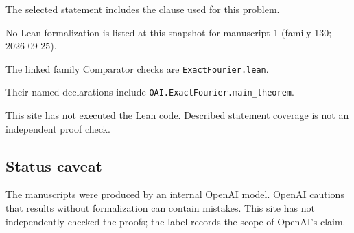 \documentclass[11pt]{article}
\begin{document}
The selected statement includes the clause used for this problem.

No Lean formalization is listed at this snapshot for manuscript 1 (family 130; 2026-09-25).

The linked family Comparator checks are \texttt{ExactFourier.lean}.

Their named declarations include \texttt{OAI.ExactFourier.main\_theorem}.

This site has not executed the Lean code. Described statement coverage is not an independent proof check.

\subsection{Status caveat}
The manuscripts were produced by an internal OpenAI model. OpenAI cautions that results without formalization can contain mistakes. This site has not independently checked the proofs; the label records the scope of OpenAI's claim.
\end{document}
